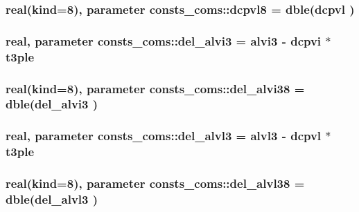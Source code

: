 \subsubsection[{\texorpdfstring{dcpvl8}{dcpvl8}}]{\setlength{\rightskip}{0pt plus 5cm}real(kind=8), parameter consts\+\_\+coms\+::dcpvl8 = dble({\bf dcpvl} )}\hypertarget{namespaceconsts__coms_a4ec7b613e368deeeb7c1078b5d2f4cf1}{}\label{namespaceconsts__coms_a4ec7b613e368deeeb7c1078b5d2f4cf1}
\subsubsection[{\texorpdfstring{del\+\_\+alvi3}{del_alvi3}}]{\setlength{\rightskip}{0pt plus 5cm}real, parameter consts\+\_\+coms\+::del\+\_\+alvi3 = {\bf alvi3} -\/ {\bf dcpvi} $\ast$ {\bf t3ple}}\hypertarget{namespaceconsts__coms_ac5a0f650b4707f552ab22cd6365257c2}{}\label{namespaceconsts__coms_ac5a0f650b4707f552ab22cd6365257c2}
\subsubsection[{\texorpdfstring{del\+\_\+alvi38}{del_alvi38}}]{\setlength{\rightskip}{0pt plus 5cm}real(kind=8), parameter consts\+\_\+coms\+::del\+\_\+alvi38 = dble({\bf del\+\_\+alvi3} )}\hypertarget{namespaceconsts__coms_ad9bb4be460a90b291f6e2a771e367880}{}\label{namespaceconsts__coms_ad9bb4be460a90b291f6e2a771e367880}
\subsubsection[{\texorpdfstring{del\+\_\+alvl3}{del_alvl3}}]{\setlength{\rightskip}{0pt plus 5cm}real, parameter consts\+\_\+coms\+::del\+\_\+alvl3 = {\bf alvl3} -\/ {\bf dcpvl} $\ast$ {\bf t3ple}}\hypertarget{namespaceconsts__coms_a809ce773fd38a8add21891c21a9a5e97}{}\label{namespaceconsts__coms_a809ce773fd38a8add21891c21a9a5e97}
\subsubsection[{\texorpdfstring{del\+\_\+alvl38}{del_alvl38}}]{\setlength{\rightskip}{0pt plus 5cm}real(kind=8), parameter consts\+\_\+coms\+::del\+\_\+alvl38 = dble({\bf del\+\_\+alvl3} )}\hypertarget{namespaceconsts__coms_a00a1e758e0133923e5be7fb331e8480f}{}\label{namespaceconsts__coms_a00a1e758e0133923e5be7fb331e8480f}
